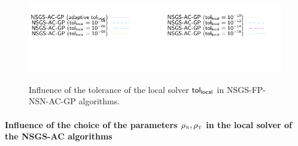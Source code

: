 \begin{figure}
   \\
{\includegraphics[width=\legendwidth]{../figure/NSGS/LocalTol/1.0e-08/50/time/profile-Chain_legend.pdf}} 
\caption{Influence of the tolerance of the local solver $\sf tol_{local}$ in {\sf NSGS-FP-NSN-AC-GP} algorithms.}
\label{fig:NSGS/LocalTol}
\end{figure}

\paragraph{Influence of the choice of the parameters $\rho_{\hbox{\tiny{N}}}, \rho_{\hbox{\tiny{T}}}$ in the local solver of the {\sf NSGS-AC} algorithms}

